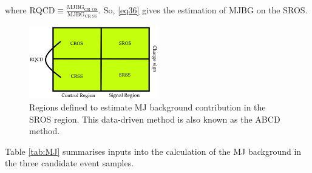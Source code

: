 where $\text{RQCD}\equiv\frac{\text{MJBG}_{\text{CR OS}}}{\text{MJBG}_{\text{CR SS}}}$. So, \eqref{eq36} gives the estimation of MJBG on the SROS.
\begin{figure}[htbp]
	\centering
	\includegraphics[width=0.5\textwidth]{figures/Fig7.png}
	\caption{Regions defined to estimate MJ background contribution in the SROS region. This data-driven method is also known as the ABCD method.}
	\label{Fig7}
\end{figure}
Table \ref{tab:MJ} summarises inputs into the calculation of the MJ background in the three candidate event samples. 
